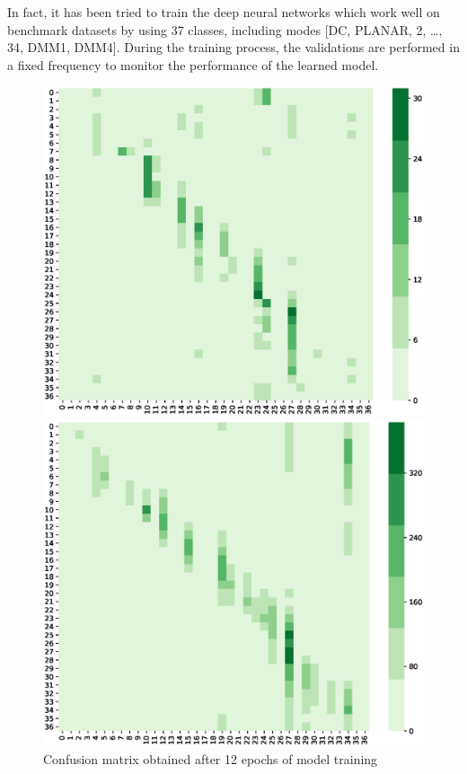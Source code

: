 In fact, it has been tried to train the deep
neural networks which work well on 
benchmark datasets by using 37 classes, 
including modes [DC, PLANAR, 2, \ldots, 34, DMM1, DMM4].
During the training process, the validations
are performed in a fixed frequency to monitor 
the performance of the learned model.
\begin{figure}
    \begin{minipage}{0.49\textwidth}
        \includegraphics[width=\textwidth,height=\textheight,keepaspectratio]{Figures/confusion-matrix/ckpt-10342.eps}
        \caption[Confusion matrix obtained after 12 epochs of model training]
        {Confusion matrix obtained after 12 epochs of model training}
        \label{fig:cm-after-12-epochs}
    \end{minipage}
    \hspace{\fill} %
    \begin{minipage}{0.49\textwidth}
        \includegraphics[width=\textwidth,height=\textheight,keepaspectratio]{Figures/confusion-matrix/ckpt-20622.eps}

\end{minipage}
\end{figure}
